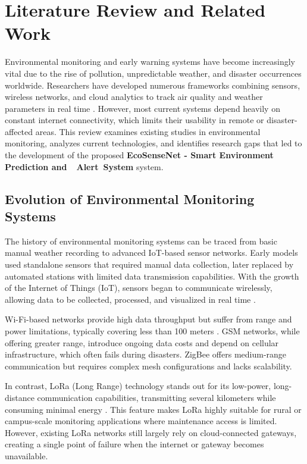 \chapter{Literature Review and Related Work}

Environmental monitoring and early warning systems have become increasingly vital due to the rise of pollution, unpredictable weather, and disaster occurrences worldwide. Researchers have developed numerous frameworks combining sensors, wireless networks, and cloud analytics to track air quality and weather parameters in real time \cite{smart_env_monitoring2023, iot_monitoring2022}. However, most current systems depend heavily on constant internet connectivity, which limits their usability in remote or disaster-affected areas. This review examines existing studies in environmental monitoring, analyzes current technologies, and identifies research gaps that led to the development of the proposed \textbf{EcoSenseNet - Smart Environment Prediction and  Alert System} system.

\section{Evolution of Environmental Monitoring Systems}

The history of environmental monitoring systems can be traced from basic manual weather recording to advanced IoT-based sensor networks. Early models used standalone sensors that required manual data collection, later replaced by automated stations with limited data transmission capabilities. With the growth of the Internet of Things (IoT), sensors began to communicate wirelessly, allowing data to be collected, processed, and visualized in real time \cite{iot_sensors_review2021}.

Wi-Fi-based networks provide high data throughput but suffer from range and power limitations, typically covering less than 100 meters \cite{lora_vs_wifi2022}. GSM networks, while offering greater range, introduce ongoing data costs and depend on cellular infrastructure, which often fails during disasters. ZigBee offers medium-range communication but requires complex mesh configurations and lacks scalability.

In contrast, LoRa (Long Range) technology stands out for its low-power, long-distance communication capabilities, transmitting several kilometers while consuming minimal energy \cite{lora_network2023}. This feature makes LoRa highly suitable for rural or campus-scale monitoring applications where maintenance access is limited. However, existing LoRa networks still largely rely on cloud-connected gateways, creating a single point of failure when the internet or gateway becomes unavailable.

